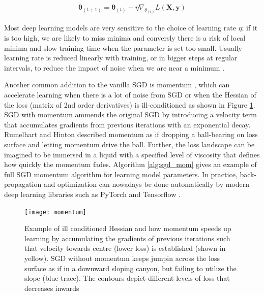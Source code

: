 \documentclass[12pt]{report}
\begin{document}
\begin{align} \label{sgd_eq}
  \pmb{\theta}_{(t+1)}=\pmb{\theta}_{(t)} - \eta \nabla_{\theta_{(t)}}L(\mathbf{X}, \mathbf{y})
\end{align}

Most deep learning models are very sensitive to the choice of learning rate $\eta$; if it is too high, we are likely to miss minima and conversly there is a risk of local minima and slow training time when the parameter is set too small. Usually learning rate is reduced linearly with training, or in bigger steps at regular intervals, to reduce the impact of noise when we are near a minimum \cite{Goodfellow2016}.

Another common addition to the vanilla SGD is momentum \cite{Rumelhart1985}, which can accelerate learning when there is a lot of noise from SGD or when the Hessian of the loss (matrix of 2nd order derivatives) is ill-conditioned as shown in Figure \ref{fig:momentum}. SGD with momentum ammends the original SGD by introducing a velocity term that accumulates gradients from previous iterations with an exponential decay. Rumelhart and Hinton \cite{Rumelhart1985} described momentum as if dropping a ball-bearing on loss surface and letting momentum drive the ball. Further, the loss landscape can be imagined to be immersed in a liquid with a specified level of viscosity that defines how quickly the momentum fades. Algorithm \ref{alg:sgd_mom} gives an example of full SGD momentum algorithm for learning model parameters. In practice, back-propagation and optimization can nowadays be done automatically by modern deep learning libraries such as PyTorch \cite{Paszke2017} and Tensorflow \cite{Abadi2015}. 

\begin{figure}
  \centering
	\texttt{[image: momentum]}
	\caption{Example of ill conditioned Hessian and how momentum speeds up learning by accumulating the gradients of previous iterations such that velocity towards centre (lower loss) is established (shown in yellow). SGD without momentum keeps jumpin across the loss surface as if in a downward sloping canyon, but failing to utilize the slope (blue trace). The contours depict different levels of loss that decreases inwards}
	\label{fig:momentum}
\end{figure}
\end{document}
